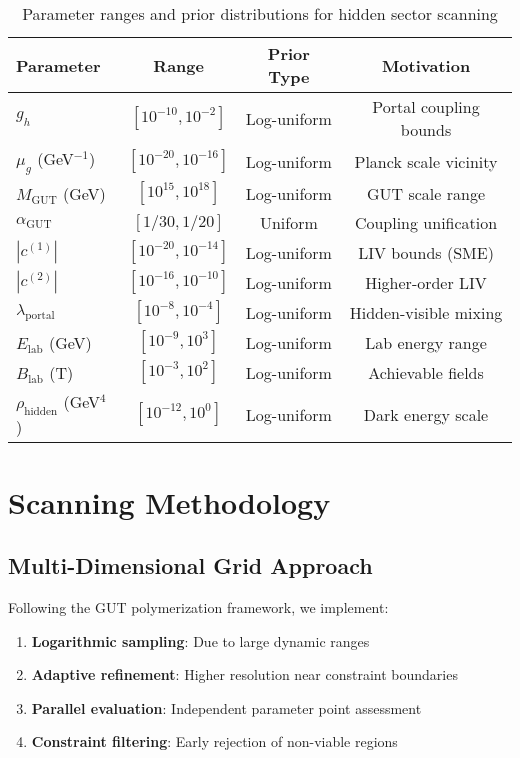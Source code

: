 \documentclass[11pt]{article}
\begin{document}
\begin{table}[h]
\centering
\begin{tabular}{lccc}
\toprule
\textbf{Parameter} & \textbf{Range} & \textbf{Prior Type} & \textbf{Motivation} \\
\midrule
$g_h$ & $[10^{-10}, 10^{-2}]$ & Log-uniform & Portal coupling bounds \\
$\mu_g$ (GeV$^{-1}$) & $[10^{-20}, 10^{-16}]$ & Log-uniform & Planck scale vicinity \\
$M_{\text{GUT}}$ (GeV) & $[10^{15}, 10^{18}]$ & Log-uniform & GUT scale range \\
$\alpha_{\text{GUT}}$ & $[1/30, 1/20]$ & Uniform & Coupling unification \\
$|c^{(1)}|$ & $[10^{-20}, 10^{-14}]$ & Log-uniform & LIV bounds (SME) \\
$|c^{(2)}|$ & $[10^{-16}, 10^{-10}]$ & Log-uniform & Higher-order LIV \\
$\lambda_{\text{portal}}$ & $[10^{-8}, 10^{-4}]$ & Log-uniform & Hidden-visible mixing \\
$E_{\text{lab}}$ (GeV) & $[10^{-9}, 10^{3}]$ & Log-uniform & Lab energy range \\
$B_{\text{lab}}$ (T) & $[10^{-3}, 10^{2}]$ & Log-uniform & Achievable fields \\
$\rho_{\text{hidden}}$ (GeV$^4$) & $[10^{-12}, 10^{0}]$ & Log-uniform & Dark energy scale \\
\bottomrule
\end{tabular}
\caption{Parameter ranges and prior distributions for hidden sector scanning}
\end{table}

\section{Scanning Methodology}

\subsection{Multi-Dimensional Grid Approach}

Following the GUT polymerization framework, we implement:

\begin{enumerate}
    \item \textbf{Logarithmic sampling}: Due to large dynamic ranges
    \item \textbf{Adaptive refinement}: Higher resolution near constraint boundaries
    \item \textbf{Parallel evaluation}: Independent parameter point assessment
    \item \textbf{Constraint filtering}: Early rejection of non-viable regions
\end{enumerate}
\end{document}
